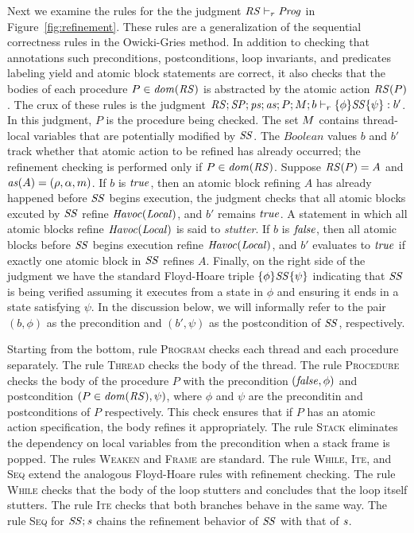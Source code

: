 Next we examine the rules for the the judgment $\mathit{RS} \vdash_r \mathit{Prog}$ in Figure~\ref{fig:refinement}.
These rules are a generalization of the sequential correctness rules in the Owicki-Gries method.
In addition to checking that annotations such preconditions, postconditions, loop invariants, 
and predicates labeling yield and atomic block statements are correct, it also checks that the bodies
of each procedure $P \in \mathit{dom}(\mathit{RS})$ is abstracted by the atomic action $\mathit{RS}(P)$.
The crux of these rules is the judgment $\mathit{RS};\mathit{SP};\mathit{ps};\mathit{as};P;M;b \vdash_r \{\phi\} \mathit{SS} \{\psi\} : b'$.
In this judgment, $P$ is the procedure being checked.
The set $M$ contains thread-local variables that are potentially modified by $\mathit{SS}$.
The $\mathit{Boolean}$ values $b$ and $b'$ track whether that atomic action to be refined has already occurred;
the refinement checking is performed only if $P \in \mathit{dom}(\mathit{RS})$.
Suppose $\mathit{RS}(P) = A$ and $\mathit{as}(A) = (\rho, \alpha, m)$.
If $b$ is $\mathit{true}$, then an atomic block refining $A$ has already happened before $\mathit{SS}$ begins execution, 
the judgment checks that all atomic blocks excuted by $\mathit{SS}$ refine $\mathit{Havoc}(\mathit{Local})$, and $b'$ remains $\mathit{true}$.
A statement in which all atomic blocks refine $\mathit{Havoc}(\mathit{Local})$ is said to {\em stutter}.
If $b$ is $\mathit{false}$, then all atomic blocks before $\mathit{SS}$ begins execution refine $\mathit{Havoc}(\mathit{Local})$,
and $b'$ evaluates to $\mathit{true}$ if exactly one atomic block in $\mathit{SS}$ refines $A$.
Finally, on the right side of the judgment we have the standard Floyd-Hoare triple $\{\phi\} \mathit{SS} \{\psi\}$ 
indicating that $\mathit{SS}$ is being verified assuming it executes from a state in $\phi$ and ensuring it ends in a state satisfying $\psi$.
In the discussion below, we will informally refer to the pair $(b,\phi)$ as the precondition and $(b',\psi)$
as the postcondition of $\mathit{SS}$, respectively.

Starting from the bottom, rule \textsc{Program} checks each thread and each procedure separately.
The rule \textsc{Thread} checks the body of the thread.
The rule \textsc{Procedure} checks the body of the procedure $P$ with
the precondition $(\mathit{false},\phi)$ and postcondition $(P \in \mathit{dom}(\mathit{RS}),\psi)$,
where $\phi$ and $\psi$ are the preconditin and postconditions of $P$ respectively.
This check ensures that if $P$ has an atomic action specification, the body refines it appropriately.
The rule \textsc{Stack} eliminates the dependency on local variables from the precondition when a stack frame is popped.
The rules \textsc{Weaken} and \textsc{Frame} are standard.
The rule \textsc{While}, \textsc{Ite}, and \textsc{Seq} extend the analogous Floyd-Hoare rules with refinement checking.
The rule \textsc{While} checks that the body of the loop stutters and concludes that the loop itself stutters.
The rule \textsc{Ite} checks that both branches behave in the same way.
The rule \textsc{Seq} for $\mathit{SS};\mathit{s}$ chains the refinement behavior of $\mathit{SS}$ with that of $\mathit{s}$.

